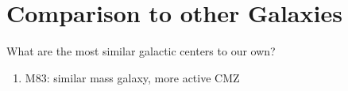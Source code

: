 \section{Comparison to other Galaxies}
What are the most similar galactic centers to our own?

\begin{enumerate}
    \item M83: similar mass galaxy, more active CMZ
\end{enumerate}
